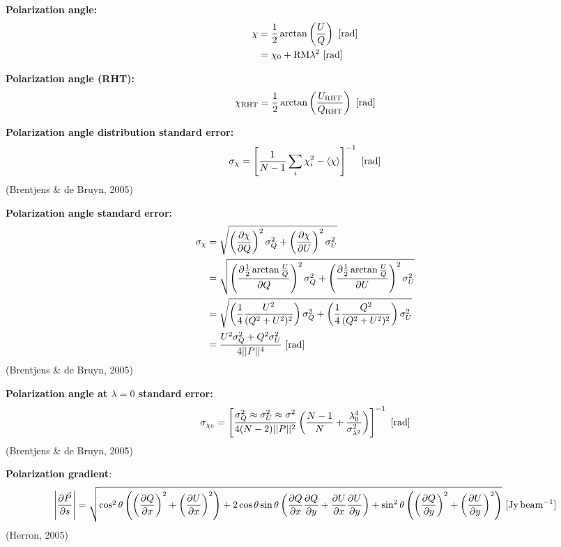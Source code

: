 \documentclass[a4paper,10pt]{article}
\begin{document}
{\noindent}\textbf{Polarization angle:}
\begin{align*}
\chi &= \dfrac{1}{2}\arctan\left(\dfrac{U}{Q}\right) ~ [{\rm rad}] \\
&= \chi_0 + \mathrm{RM}\lambda^2 ~ [{\rm rad}]
\end{align*}

{\noindent}\textbf{Polarization angle (RHT):}
\begin{align*}
\chi_\mathrm{RHT} = \dfrac{1}{2}\arctan\left(\dfrac{U_\mathrm{RHT}}{Q_\mathrm{RHT}}\right) ~ [{\rm rad}]
\end{align*}

{\noindent}\textbf{Polarization angle distribution standard error:} 
\begin{align*}
\sigma_\chi = \left[ \dfrac{1}{N-1} \sum_i\chi_i^2 - \langle\chi\rangle \right]^{-1} ~ [{\rm rad}]
\end{align*}
(Brentjens \& de Bruyn, 2005)

{\noindent}\textbf{Polarization angle standard error:}
\begin{align*}
\sigma_\chi &= \sqrt{ \left(\dfrac{\partial\chi}{\partial Q}\right)^2\sigma_Q^2 + \left(\dfrac{\partial\chi}{\partial U}\right)^2\sigma_U^2 }\\
&= \sqrt{ \left(\dfrac{\partial\frac{1}{2}\arctan\frac{U}{Q}}{\partial Q}\right)^2\sigma_Q^2 + \left(\dfrac{\partial\frac{1}{2}\arctan\frac{U}{Q}}{\partial U}\right)^2\sigma_U^2 } \\
&= \sqrt{ \left(\dfrac{1}{4}\dfrac{U^2}{(Q^2+U^2)^2}\right)\sigma_Q^2 + \left(\dfrac{1}{4}\dfrac{Q^2}{(Q^2+U^2)^2}\right)\sigma_U^2 } \\
&= \dfrac{U^2\sigma_Q^2 + Q^2\sigma_U^2}{4\lvert\lvert P \rvert\rvert^4} ~ [{\rm rad}]
\end{align*}
(Brentjens \& de Bruyn, 2005)

{\noindent}\textbf{Polarization angle at $\lambda=0$ standard error:} 
\begin{align*}
\sigma_{\chi_0} = \left[ \dfrac{\sigma_Q^2\approx\sigma_U^2\approx\sigma^2}{4(N-2)\lvert\lvert P \rvert\rvert^2} \left( \dfrac{N-1}{N} + \dfrac{\lambda_0^4}{\sigma_{\lambda^2}^2} \right) \right]^{-1} ~ [{\rm rad}]
\end{align*}
(Brentjens \& de Bruyn, 2005)

{\noindent}\textbf{Polarization gradient}:
\begin{align*}
	\left\lvert\dfrac{\partial\vec{P}}{\partial s}\right\rvert = \sqrt{ \cos^2\theta\left(\left(\frac{\partial Q}{\partial x}\right)^2+\left(\frac{\partial U}{\partial x}\right)^2\right) + 2\cos\theta\sin\theta\left(\frac{\partial Q}{\partial x}\frac{\partial Q}{\partial y} + \frac{\partial U}{\partial x}\frac{\partial U}{\partial y}\right) + \sin^2\theta\left(\left(\frac{\partial Q}{\partial y}\right)^2 + \left(\frac{\partial U}{\partial y}\right)^2\right) } ~ [\rm Jy\,beam^{-1}]
\end{align*}
(Herron, 2005)
\end{document}
